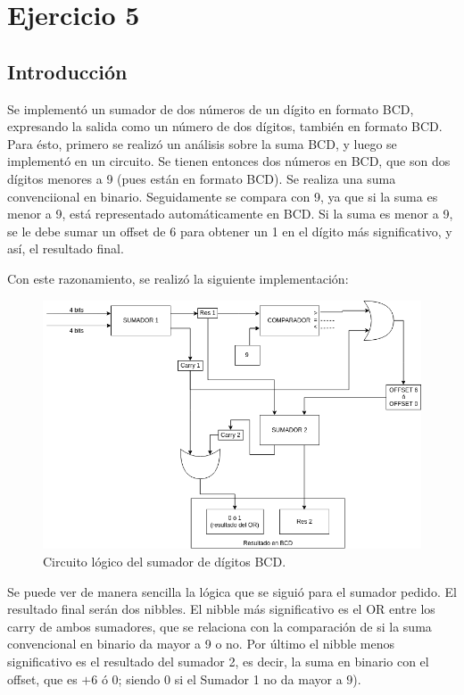 \section{Ejercicio 5}
\subsection{Introducción}

Se implementó un sumador de dos números de un dígito en formato BCD, expresando la salida como un número de dos dígitos, también en formato BCD.
Para ésto, primero se realizó un análisis sobre la suma BCD, y luego se implementó en un circuito.
Se tienen entonces dos números en BCD, que son dos dígitos menores a 9 (pues están en formato BCD). Se realiza una suma convenciional en binario. Seguidamente se compara con 9, ya que si la suma es menor a 9, está representado automáticamente en BCD.
Si la suma es menor a 9, se le debe sumar un offset de 6 para obtener un 1 en el dígito más significativo, y así, el resultado final. 

Con este razonamiento, se realizó la siguiente implementación:
\begin{figure}[H]
    \begin{center}
        \caption{Circuito lógico del sumador de dígitos BCD.}
\includegraphics[scale=0.5]{circuito.png}
    \end{center}
\end{figure}

Se puede ver de manera sencilla la lógica que se siguió para el sumador pedido. El resultado final serán dos nibbles. El nibble más significativo es el OR entre los carry de ambos sumadores, que se relaciona con la comparación de si la suma convencional 
en binario da mayor a 9 o no. Por último el nibble menos significativo es el resultado del sumador 2, es decir, la suma en binario con el offset, que es $+6$ ó $0$; siendo $0$ si el Sumador 1 no da mayor a $9$).
